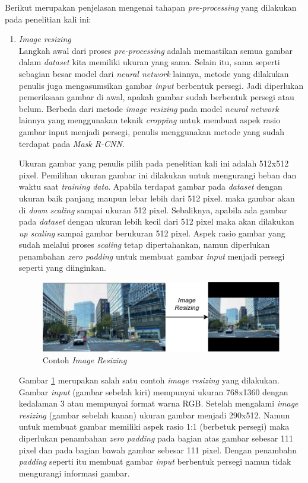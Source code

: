 \documentclass[conference]{IEEEtran}
\begin{document}
	Berikut merupakan penjelasan mengenai tahapan \textit{pre-processing} yang dilakukan pada penelitian kali ini:
	\begin{enumerate}
		\item \textit{Image resizing}\\
		Langkah awal dari proses \textit{pre-processing} adalah memastikan semua gambar dalam \textit{dataset} kita memiliki ukuran yang sama. Selain itu, sama seperti sebagian besar model dari \textit{neural network} lainnya, metode yang dilakukan penulis juga mengasumsikan gambar \textit{input} berbentuk persegi. Jadi diperlukan pemeriksaan gambar di awal, apakah gambar sudah berbentuk persegi atau belum. Berbeda dari metode \textit{image resizing} pada model \textit{neural network} lainnya yang menggunakan teknik \textit{cropping} untuk membuat aspek rasio gambar input menjadi persegi, penulis menggunakan metode yang sudah terdapat pada \textit{Mask R-CNN}.
		
		Ukuran gambar yang penulis pilih pada penelitian kali ini adalah 512x512 pixel. Pemilihan ukuran gambar ini dilakukan untuk mengurangi beban dan waktu saat \textit{training data}. Apabila terdapat gambar pada \textit{dataset} dengan ukuran baik panjang maupun lebar lebih dari 512 pixel. maka gambar akan di \textit{down scaling} sampai ukuran 512 pixel. Sebaliknya, apabila ada gambar pada \textit{dataset} dengan ukuran lebih kecil dari 512 pixel maka akan dilakukan \textit{up scaling} sampai gambar berukuran 512 pixel. Aspek rasio gambar yang sudah melalui proses \textit{scaling} tetap dipertahankan, namun diperlukan penambahan \textit{zero padding} untuk membuat gambar \textit{input} menjadi persegi seperti yang diinginkan.
		
		\begin{figure}[h]
			\centering
			\includegraphics[scale=0.5]{img/image-resizing.png}
			\caption{Contoh \textit{Image Resizing}}
			\label{fig:image-resizing}
		\end{figure}
		
		Gambar \ref{fig:image-resizing} merupakan salah satu contoh \textit{image resizing} yang dilakukan. Gambar \textit{input} (gambar sebelah kiri) mempunyai ukuran 768x1360 dengan kedalaman 3 atau mempunyai format warna RGB. Setelah mengalami \textit{image resizing} (gambar sebelah kanan) ukuran gambar menjadi 290x512. Namun untuk membuat gambar memiliki aspek rasio 1:1 (berbetuk persegi) maka diperlukan penambahan \textit{zero padding} pada bagian atas gambar sebesar 111 pixel dan pada bagian bawah gambar sebesar 111 pixel. Dengan penambahn \textit{padding} seperti itu membuat gambar \textit{input} berbentuk persegi namun tidak mengurangi informasi gambar. 
		

\end{enumerate}
\end{document}
